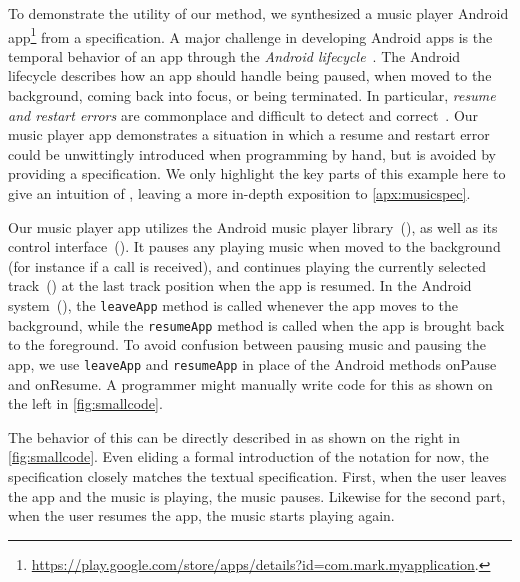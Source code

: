 \newcommand{\applink}{\url{https://play.google.com/store/apps/details?id=com.mark.myapplication}.}

To demonstrate the utility of our method, we synthesized a music player Android app\footnote{\applink} from a \TSL specification.
A major challenge in developing Android apps is the temporal behavior of an app through the \textit{Android lifecycle}~\cite{Shan16}.
The Android lifecycle describes how an app should handle being paused, when moved to the background, coming back into focus, or being terminated.
In particular, \textit{resume and restart errors} are commonplace and difficult to detect and correct~\cite{Shan16}.
Our music player app demonstrates a situation in which a resume and restart error could be unwittingly introduced when programming by hand, but is avoided by providing a specification.
We only highlight the key parts of this example here to give an intuition of \TSL, leaving a more in-depth exposition to \cref{apx:musicspec}.

Our music player app utilizes the Android music player library~(), as well as its control interface~(). It pauses any playing music when moved to the background (for instance if a call is received), and continues playing the currently selected track~() at the last track position when the app is resumed.
In the Android system~(), the \texttt{leaveApp} method is called whenever the app moves to the background, while the \texttt{resumeApp} method is called when the app is brought back to the foreground. To avoid confusion between pausing music and pausing the app, we use \texttt{leaveApp} and \texttt{resumeApp} in place of the Android methods onPause and onResume.
A programmer might manually write code for this as shown on the left in \cref{fig:smallcode}.

The behavior of this can be directly described in \TSL as shown on the right in \cref{fig:smallcode}.
Even eliding a formal introduction of the notation for now, the specification closely matches the textual specification.
First, when the user leaves the app and the music is playing, the music pauses.
Likewise for the second part, when the user resumes the app, the music starts playing again.

